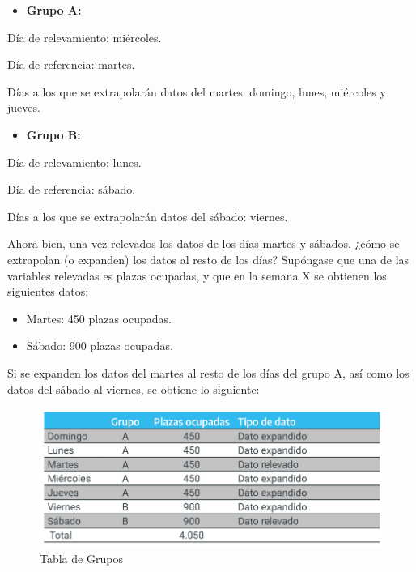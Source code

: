 \documentclass[
]{book}
\providecommand{\tightlist}{%
  \setlength{\itemsep}{0pt}\setlength{\parskip}{0pt}}
\begin{document}
\begin{itemize}
\tightlist
\item
  \textbf{Grupo A:}
\end{itemize}

Día de relevamiento: miércoles.

Día de referencia: martes.

Días a los que se extrapolarán datos del martes: domingo, lunes, miércoles y jueves.

\begin{itemize}
\tightlist
\item
  \textbf{Grupo B:}
\end{itemize}

Día de relevamiento: lunes.

Día de referencia: sábado.

Días a los que se extrapolarán datos del sábado: viernes.

Ahora bien, una vez relevados los datos de los días martes y sábados, ¿cómo se extrapolan (o expanden) los datos al resto de los días? Supóngase que una de las variables relevadas es plazas ocupadas, y que en la semana X se obtienen los siguientes datos:

\begin{itemize}
\item
  Martes: 450 plazas ocupadas.
\item
  Sábado: 900 plazas ocupadas.
\end{itemize}

Si se expanden los datos del martes al resto de los días del grupo A, así como los datos del sábado al viernes, se obtiene lo siguiente:

\begin{figure}

{\centering \includegraphics[width=1\linewidth]{imagenes/tabla_5a} 

}

\caption{Tabla de Grupos}\label{fig:grupo-a-b}
\end{figure}
\end{document}
